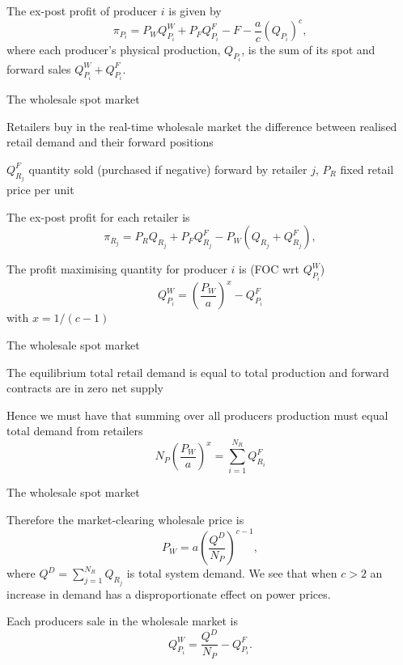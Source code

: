 	The ex-post profit of producer $i$ is given by
$$
\pi_{P_i}=P_W Q_{P_i}^W + P_FQ_{P_i}^F
-F-\frac{a}{c}(Q_{P_i})^c,$$
where each producer's physical production, $Q_{P_i}$, is the sum of its spot and forward sales $Q_{P_i}^W+Q_{P_i}^F$.





{The wholesale spot market}






	Retailers buy in the real-time wholesale market the difference between realised retail demand and their forward positions


	$Q_{R_j}^F$ quantity sold (purchased if negative) forward by retailer $j$, $P_R$ fixed retail price per unit


	The ex-post profit for each retailer is
$$
\pi_{R_j}=P_R Q_{R_j} + P_FQ_{R_j}^F - P_W (Q_{R_j}+Q_{R_j}^F),$$


	The profit maximising quantity for producer $i$ is (FOC wrt $Q_{P_i}^W$)
$$Q_{P_i}^W=\left(\frac{P_W}{a}\right)^{x}-Q_{P_i}^F$$
with $x=1/(c-1)$





{The wholesale spot market}






	The equilibrium total retail demand is equal to total production and forward contracts are in zero net supply


	Hence we must have that summing over all producers production must equal total demand from retailers
$$
N_P\left(\frac{P_W}{a}\right)^{x}=\sum_{i=1}^{N_R}Q_{R_i}^F
$$





{The wholesale spot market}






	Therefore the market-clearing wholesale price is
$$
P_W=a \left(\frac{Q^D}{N_P}\right)^{c-1},$$
where $Q^D=\sum_{j=1}^{N_R}Q_{R_j}$ is total system demand. We see that when $c>2$ an increase in demand has a disproportionate effect on power prices.


	Each producers sale in the wholesale market is
$$
Q_{P_i}^W= \frac{Q^D}{N_P}-Q_{P_i}^F.
$$





